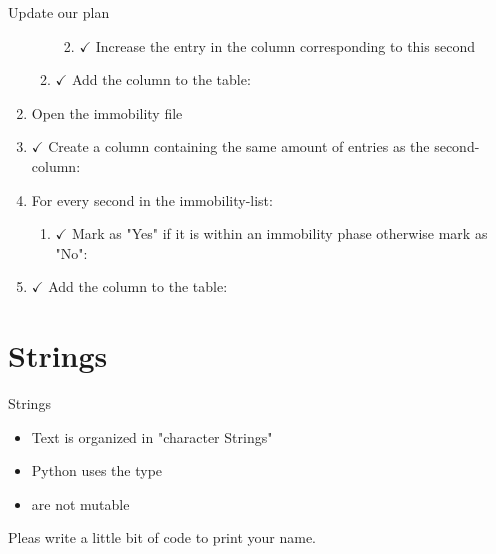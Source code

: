 \documentclass[aspectratio=169]{beamer}
\begin{document}
\begin{frame}{Update our plan}
\begin{enumerate}
\begin{enumerate}
\begin{enumerate}
{		}
		\item {\begin{math} \checkmark \end{math}
			Increase the entry in the column corresponding to this second
		}
	\end{enumerate}
	\item {\begin{math} \checkmark \end{math}
		Add the column to the table:
	}
\end{enumerate}
\item {Open the immobility file}
\item {\begin{math} \checkmark \end{math}
	Create a column containing the same amount of entries as the second-column:
}
\item {For every second in the immobility-list:}
\begin{enumerate}
	\item {\begin{math} \checkmark \end{math}
		Mark as "Yes" if it is within an immobility phase otherwise mark as "No":
	}
\end{enumerate}
\item {\begin{math} \checkmark \end{math}
	Add the column to the table:
}
\end{enumerate}
\end{frame}

\section{Strings}
\begin{frame}{Strings}
\begin{itemize}
	\item Text is organized in "character Strings"
	\item Python uses the type 
	\item {} are not mutable
\end{itemize}

Pleas write a little bit of code to print your name.

\end{frame}
\end{document}
